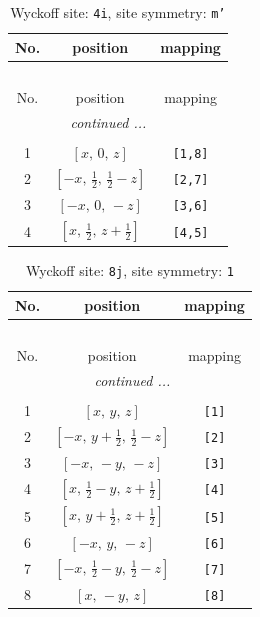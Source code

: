 \documentclass[fleqn,8pt]{jsarticle}
\begin{document}
\renewcommand{\arraystretch}{1.2}
\begin{longtable}{ccc}
\caption{Wyckoff site: {\tt 4i}, site symmetry: {\tt m'}}
 \\
 \hline \hline
No. & position & mapping \\ \hline \endfirsthead

\multicolumn{2}{l}{\tablename\ \thetable{}} \\
 \hline \hline
No. & position & mapping \\ \hline \endhead

 \hline \hline
\multicolumn{2}{r}{\footnotesize\it continued ...} \\ \endfoot

 \hline \hline
\multicolumn{2}{r}{} \\ \endlastfoot

1 & $\left[ x,\, 0,\, z \right]$ & {\tt [1,8]} \\ \hline
2 & $\left[ - x,\, \frac{1}{2},\, \frac{1}{2} - z \right]$ & {\tt [2,7]} \\ \hline
3 & $\left[ - x,\, 0,\, - z \right]$ & {\tt [3,6]} \\ \hline
4 & $\left[ x,\, \frac{1}{2},\, z + \frac{1}{2} \right]$ & {\tt [4,5]} \\
\end{longtable}
\renewcommand{\arraystretch}{1.2}
\begin{longtable}{ccc}
\caption{Wyckoff site: {\tt 8j}, site symmetry: {\tt 1}}
 \\
 \hline \hline
No. & position & mapping \\ \hline \endfirsthead

\multicolumn{2}{l}{\tablename\ \thetable{}} \\
 \hline \hline
No. & position & mapping \\ \hline \endhead

 \hline \hline
\multicolumn{2}{r}{\footnotesize\it continued ...} \\ \endfoot

 \hline \hline
\multicolumn{2}{r}{} \\ \endlastfoot

1 & $\left[ x,\, y,\, z \right]$ & {\tt [1]} \\ \hline
2 & $\left[ - x,\, y + \frac{1}{2},\, \frac{1}{2} - z \right]$ & {\tt [2]} \\ \hline
3 & $\left[ - x,\, - y,\, - z \right]$ & {\tt [3]} \\ \hline
4 & $\left[ x,\, \frac{1}{2} - y,\, z + \frac{1}{2} \right]$ & {\tt [4]} \\ \hline
5 & $\left[ x,\, y + \frac{1}{2},\, z + \frac{1}{2} \right]$ & {\tt [5]} \\ \hline
6 & $\left[ - x,\, y,\, - z \right]$ & {\tt [6]} \\ \hline
7 & $\left[ - x,\, \frac{1}{2} - y,\, \frac{1}{2} - z \right]$ & {\tt [7]} \\ \hline
8 & $\left[ x,\, - y,\, z \right]$ & {\tt [8]} \\
\end{longtable}
\end{document}
